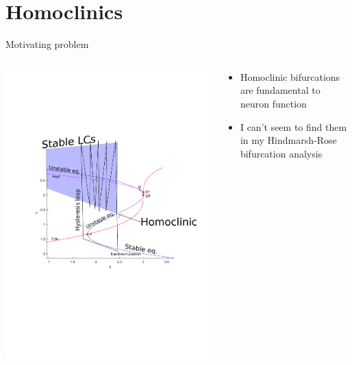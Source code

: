 \documentclass[presentation]{beamer}
\begin{document}
\section{Homoclinics}
\label{sec:orgbbe1357}
\begin{frame}[label={sec:org81e3b7b}]{Motivating problem}
\begin{columns}
\begin{column}{0.6\columnwidth}
\begin{center}
\includegraphics[trim={3cm 9cm 0cm 5cm}, clip,height=.7\textheight]{HRzbBif2 (copy 1).pdf}
\end{center}
\end{column}
\begin{column}{0.4\columnwidth}
\begin{itemize}
\item Homoclinic bifurcations are fundamental to neuron function
\item I can't seem to find them in my Hindmarsh-Rose bifurcation analysis
\end{itemize}
\end{column}
\end{columns}
\end{frame}
\end{document}
